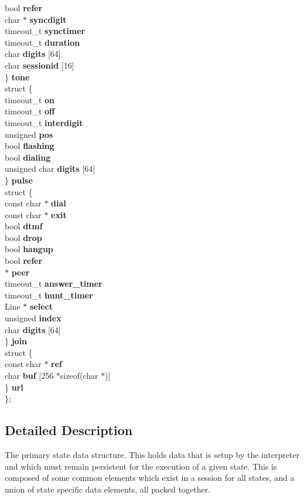 \begin{DoxyCompactItemize}
\begin{tabbing}
\>\>bool {\bf refer}\\
\>\>char $\ast$ {\bf syncdigit}\\
\>\>timeout\_t {\bf synctimer}\\
\>\>timeout\_t {\bf duration}\\
\>\>char {\bf digits} [64]\\
\>\>char {\bf sessionid} [16]\\
\>\} {\bf tone}\\
\>struct \{\\
\>\>timeout\_t {\bf on}\\
\>\>timeout\_t {\bf off}\\
\>\>timeout\_t {\bf interdigit}\\
\>\>unsigned {\bf pos}\\
\>\>bool {\bf flashing}\\
\>\>bool {\bf dialing}\\
\>\>unsigned char {\bf digits} [64]\\
\>\} {\bf pulse}\\
\>struct \{\\
\>\>const char $\ast$ {\bf dial}\\
\>\>const char $\ast$ {\bf exit}\\
\>\>bool {\bf dtmf}\\
\>\>bool {\bf drop}\\
\>\>bool {\bf hangup}\\
\>\>bool {\bf refer}\\
\> $\ast$ {\bf peer}\\
\>\>timeout\_t {\bf answer\_timer}\\
\>\>timeout\_t {\bf hunt\_timer}\\
\>\>Line $\ast$ {\bf select}\\
\>\>unsigned {\bf index}\\
\>\>char {\bf digits} [64]\\
\>\} {\bf join}\\
\>struct \{\\
\>\>const char $\ast$ {\bf ref}\\
\>\>char {\bf buf} [256 $\ast$sizeof(char $\ast$)]\\
\>\} {\bf url}\\
\}; \\

\end{tabbing}\end{DoxyCompactItemize}


\subsection{Detailed Description}
The primary state data structure. This holds data that is setup by the interpreter and which must remain persistent for the execution of a given state. This is composed of some common elements which exist in a session for all states, and a union of state specific data elements, all packed together. 

